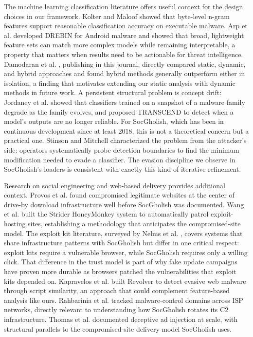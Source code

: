 \documentclass[pdflatex,sn-mathphys-num]{sn-jnl}
\theoremstyle{thmstyleone}%
\theoremstyle{thmstyletwo}%
\theoremstyle{thmstylethree}%
\begin{document}
The machine learning classification literature offers useful context for the design choices in our framework. Kolter and Maloof \cite{kolter2006} showed that byte-level n-gram features support reasonable classification accuracy on executable malware. Arp et al. \cite{arp2014} developed DREBIN for Android malware and showed that broad, lightweight feature sets can match more complex models while remaining interpretable, a property that matters when results need to be actionable for threat intelligence. Damodaran et al. \cite{damodaran2017}, publishing in this journal, directly compared static, dynamic, and hybrid approaches and found hybrid methods generally outperform either in isolation, a finding that motivates extending our static analysis with dynamic methods in future work. A persistent structural problem is concept drift: Jordaney et al. \cite{jordaney2017} showed that classifiers trained on a snapshot of a malware family degrade as the family evolves, and proposed TRANSCEND to detect when a model's outputs are no longer reliable. For SocGholish, which has been in continuous development since at least 2018, this is not a theoretical concern but a practical one. Stinson and Mitchell \cite{stinson2008} characterized the problem from the attacker's side: operators systematically probe detection boundaries to find the minimum modification needed to evade a classifier. The evasion discipline we observe in SocGholish's loaders is consistent with exactly this kind of iterative refinement.

Research on social engineering and web-based delivery provides additional context. Provos et al. \cite{provos2007} found compromised legitimate websites at the center of drive-by download infrastructure well before SocGholish was documented. Wang et al. \cite{wang2006} built the Strider HoneyMonkey system to automatically patrol exploit-hosting sites, establishing a methodology that anticipates the compromised-site model. The exploit kit literature, surveyed by Nelms et al. \cite{nelms2015}, covers systems that share infrastructure patterns with SocGholish but differ in one critical respect: exploit kits require a vulnerable browser, while SocGholish requires only a willing click. That difference in the trust model is part of why fake update campaigns have proven more durable as browsers patched the vulnerabilities that exploit kits depended on. Kapravelos et al. \cite{kapravelos2013} built Revolver to detect evasive web malware through script similarity, an approach that could complement feature-based analysis like ours. Rahbarinia et al. \cite{rahbarinia2015} tracked malware-control domains across ISP networks, directly relevant to understanding how SocGholish rotates its C2 infrastructure. Thomas et al. \cite{thomas2015} documented deceptive ad injection at scale, with structural parallels to the compromised-site delivery model SocGholish uses.
\end{document}
